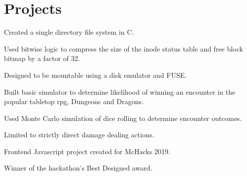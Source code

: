 \documentclass[]{willguthrie-resume}
\begin{document}
\begin{minipage}[t]{0.66\textwidth}
	
	\sectionsep
	\section{Projects}

	\begin{tightemize}
		\item Created a single directory file system in C.
		\item Used bitwise logic to compress the size of the inode status table and free block bitmap by a factor of 32.
		\item Designed to be mountable using a disk emulator and FUSE.
	\end{tightemize}

	\begin{tightemize}
		\item Built basic simulator to determine likelihood of winning an encounter in the popular tabletop rpg, Dungeons and Dragons.
		\item Used Monte Carlo simulation of dice rolling to determine encounter outcomes.
		\item Limited to strictly direct damage dealing actions.
	\end{tightemize}

	\begin{tightemize}
		\item Frontend Javascript project created for McHacks 2019.
		\item Winner of the hackathon's Best Designed award.
	\end{tightemize}


\end{minipage}
\end{document}
